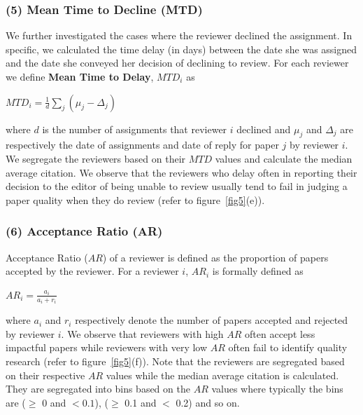 \subsubsection*{(5) Mean Time to Decline (MTD)}

We further investigated the cases where the reviewer declined the assignment. In specific, we calculated the time delay (in days) 
between the date she was assigned and the date she conveyed her decision of declining to review. For each reviewer we define {\bf Mean Time to Delay}, $MTD_{i}$ as 

\begin{center}
$MTD_{i}= \frac{1}{d}\sum \limits_{j}(\mu_{j} - \Delta_{j})$
\end{center}

where $d$ is the number of assignments that reviewer $i$ declined and $\mu_{j}$ and $\Delta_{j}$ are respectively the date of assignments and date of reply for paper $j$ by reviewer $i$. We segregate the reviewers based on their $MTD$ values and calculate the median average citation. We observe that the reviewers who delay often in reporting their decision to the editor of being unable to review usually tend to fail in judging a paper quality when they do review (refer to figure~\ref{fig5}(e)).

\subsubsection*{(6) Acceptance Ratio (AR)}
Acceptance Ratio ($AR$) of a reviewer is defined as the proportion of papers accepted by the reviewer. For a reviewer $i$, $AR_{i}$ is formally defined as 

\begin{center}
$AR_{i}=\frac{a_{i}}{a_{i}+r_{i}}$
\end{center}

\noindent where $a_{i}$ and $r_{i}$ respectively denote the number of papers accepted and rejected by reviewer $i$. We observe that reviewers with high $AR$ often accept  less impactful papers while reviewers with very low $AR$ often fail to identify quality research (refer to figure~\ref{fig5}(f)). Note that the reviewers are segregated based on their respective $AR$ values while the median average citation is calculated. They are segregated into bins based on the $AR$ values where typically the bins are ($\geq$ 0 and $< 0.1$), ($\geq$ 0.1 and $<$ 0.2) and so on.

